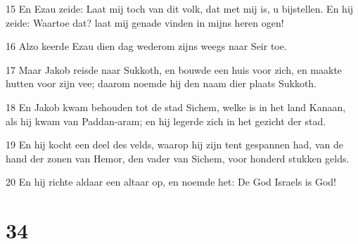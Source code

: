 \par 15 En Ezau zeide: Laat mij toch van dit volk, dat met mij is, u bijstellen. En hij zeide: Waartoe dat? laat mij genade vinden in mijns heren ogen!
\par 16 Alzo keerde Ezau dien dag wederom zijns weegs naar Seir toe.
\par 17 Maar Jakob reisde naar Sukkoth, en bouwde een huis voor zich, en maakte hutten voor zijn vee; daarom noemde hij den naam dier plaats Sukkoth.
\par 18 En Jakob kwam behouden tot de stad Sichem, welke is in het land Kanaan, als hij kwam van Paddan-aram; en hij legerde zich in het gezicht der stad.
\par 19 En hij kocht een deel des velds, waarop hij zijn tent gespannen had, van de hand der zonen van Hemor, den vader van Sichem, voor honderd stukken gelds.
\par 20 En hij richte aldaar een altaar op, en noemde het: De God Israels is God!

\chapter{34}

